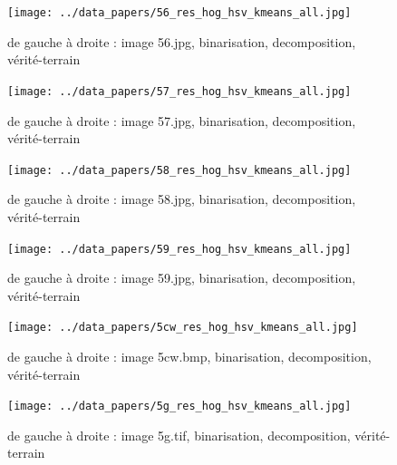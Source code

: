 \documentclass{book}
\begin{document}
\begin{figure}[H]
\begin{center}
\texttt{[image: ../data\_papers/56\_res\_hog\_hsv\_kmeans\_all.jpg]}
\end{center}
\caption{de gauche à droite : image 56.jpg, binarisation, decomposition, vérité-terrain}
\label{56}
\end{figure}
\clearpage


\begin{figure}[H]
\begin{center}
\texttt{[image: ../data\_papers/57\_res\_hog\_hsv\_kmeans\_all.jpg]}
\end{center}
\caption{de gauche à droite : image 57.jpg, binarisation, decomposition, vérité-terrain}
\label{57}
\end{figure}
\clearpage


\begin{figure}[H]
\begin{center}
\texttt{[image: ../data\_papers/58\_res\_hog\_hsv\_kmeans\_all.jpg]}
\end{center}
\caption{de gauche à droite : image 58.jpg, binarisation, decomposition, vérité-terrain}
\label{58}
\end{figure}
\clearpage


\begin{figure}[H]
\begin{center}
\texttt{[image: ../data\_papers/59\_res\_hog\_hsv\_kmeans\_all.jpg]}
\end{center}
\caption{de gauche à droite : image 59.jpg, binarisation, decomposition, vérité-terrain}
\label{59}
\end{figure}
\clearpage


\begin{figure}[H]
\begin{center}
\texttt{[image: ../data\_papers/5cw\_res\_hog\_hsv\_kmeans\_all.jpg]}
\end{center}
\caption{de gauche à droite : image 5cw.bmp, binarisation, decomposition, vérité-terrain}
\label{5cw}
\end{figure}
\clearpage


\begin{figure}[H]
\begin{center}
\texttt{[image: ../data\_papers/5g\_res\_hog\_hsv\_kmeans\_all.jpg]}
\end{center}
\caption{de gauche à droite : image 5g.tif, binarisation, decomposition, vérité-terrain}
\label{5g}
\end{figure}
\clearpage
\end{document}
